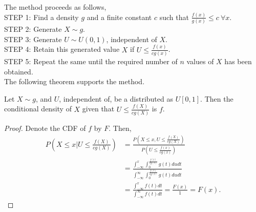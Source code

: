 The method proceeds as follows, \\
STEP 1: Find a density $g$ and a finite constant  $c$ such that  $\frac{f(x)}{g(x)}\le c \ \forall x$.\\
STEP 2: Generate $X\sim g$.\\
STEP 3: Generate  $U\sim U(0,1)$, independent of  $X$. \\
STEP 4: Retain this generated value  $X$ if  $U\le \frac{f(x)}{cg(x)}$.\\
STEP 5: Repeat the same until the required number of $n$ values of  $X$ has been obtained.\\

The following theorem supports the method.
\begin{theorem}
	Let $X\sim g$, and  $U$, independent of, be a distributed as $U[0,1]$. Then the conditional density of $X$ given that
	$U\le \frac{f(X)}{cg(X)}$ is $f$.
\end{theorem}
\begin{proof}
	Denote the CDF of $f$ by $F$. Then,
	\begin{align*}
		P\left( X\le x|U\le \frac{f(X)}{cg(X)} \right) & = \frac{P\left( X\le x, U\le \frac{f(X)}{cg(X)} \right)}{P\left( U\le \frac{f(x)}{cg(x)} \right)}                            \\
		                                               & = \frac{\int_{-\infty}^{x}\int_{0}^{\frac{f(t)}{cg(t)}}g(t)dudt}{\int_{-\infty}^{\infty}\int_0^{\frac{f(t)}{cg(t)}}g(t)dudt} \\
		                                               & = \frac{\int_{-\infty}^{x}f(t)dt}{\int_{-\infty}^{\infty}f(t)dt} = \frac{F(x)}{1}= F(x).
	\end{align*}
\end{proof}

